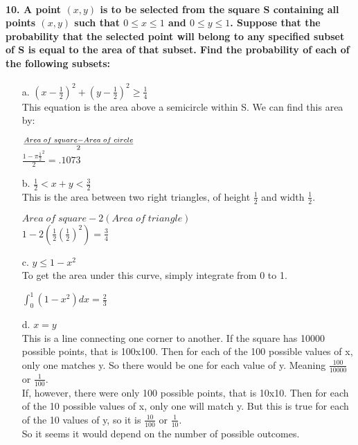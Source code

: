 \documentclass{article}
\begin{document}
\paragraph{10. A point $(x, y)$ is to be selected from the square S containing
all points $(x, y)$ such that $0 \leq x \leq 1$ and $0 \leq y \leq 1$. Suppose that
the probability that the selected point will belong to any specified subset of S is
equal to the area of that subset. Find the probability of each of the following subsets:}
\begin{enumerate}
\item[a.] $(x-\frac{1}{2})^2 + (y-\frac{1}{2})^2 \geq \frac{1}{4}$\\
This equation is the area above a semicircle within S. We can find this area by:
\begin{center}
$Area\; of\; square - Area\; of\; circle \over 2$\\
$\boxed{\frac{1-\pi\frac{1}{2}^2}{2} = .1073}$
\end{center}

\item[b.] $\frac{1}{2} < x + y < \frac{3}{2}$\\
This is the area between two right triangles, of height $\frac{1}{2}$ and width
$\frac{1}{2}$.
\begin{center}
$Area\; of\; square - 2(Area\; of\; triangle)$\\
$\boxed{1-2\left(\frac{1}{2}\left(\frac{1}{2}\right)^2\right) = \frac{3}{4}}$
\end{center}

\item[c.] $y \leq 1-x^2$\\
To get the area under this curve, simply integrate from 0 to 1.
\begin{center}
$\boxed{\int_0^1(1-x^2)dx = \frac{2}{3}}$
\end{center}

\item[d.] $x=y$\\
This is a line connecting one corner to another. If the square has 10000 possible 
points, that is 100x100. Then for each of the 100 possible values of x, only one 
matches y. So there would be one for each value of y. Meaning 
$\frac{100}{10000}$ or $\frac{1}{100}$.\\
If, however, there were only 100 possible points, that is 10x10. Then for each
of the 10 possible values of x, only one will match y. But this is true for each of
the 10 values of y, so it is $\frac{10}{100}$ or $\frac{1}{10}$.\\
So it seems it would depend on the number of possible outcomes.\\
\end{enumerate}
\end{document}

